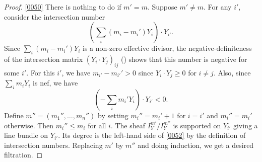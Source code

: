 \documentclass{amsart}
\theoremstyle{remark}
\numberwithin{equation}{section}
\begin{document}
\begin{proof}
	\eqref{0050}
	There is nothing to do if $m' = m$.
	Suppose $m' \ne m$.
	For any $i'$, consider the intersection number
		\[
				\left(
					\sum_{i} (m_{i} - m_{i}') Y_{i}
				\right)
			\cdot
				Y_{i'}.
		\]
	Since $\sum_{i} (m_{i} - m_{i}') Y_{i}$ is a non-zero effective divisor,
	the negative-definiteness of the intersection matrix $(Y_{i} \cdot Y_{j})_{i j}$
	(\cite[Lemma 14.1]{Lip69}) shows that
	this number is negative for some  $i'$.
	For this $i'$, we have $m_{i'} - m_{i'}' > 0$
	since $Y_{i} \cdot Y_{j} \ge 0$ for $i \ne j$.
	Also, since $\sum_{i} m_{i} Y_{i}$ is nef,
	we have
		\begin{equation} \label{0052}
					\left(
						- \sum_{i} m_{i}' Y_{i}
					\right)
				\cdot
					Y_{i'}
			<
				0.
		\end{equation}
	Define $m'' = (m_{1}'', \dots, m_{n}'')$ by setting
	$m_{i}'' = m_{i}' + 1$ for $i = i'$
	and $m_{i}'' = m_{i}'$ otherwise.
	Then $m_{i}'' \le m_{i}$ for all $i$.
	The sheaf $I_{Y}^{m'} / I_{Y}^{m''}$ is supported on $Y_{i'}$
	giving a line bundle on $Y_{i'}$.
	Its degree is the left-hand side of \eqref{0052}
	by the definition of intersection numbers.
	Replacing $m'$ by $m''$ and doing induction,
	we get a desired filtration.
	

\end{proof}
\end{document}

